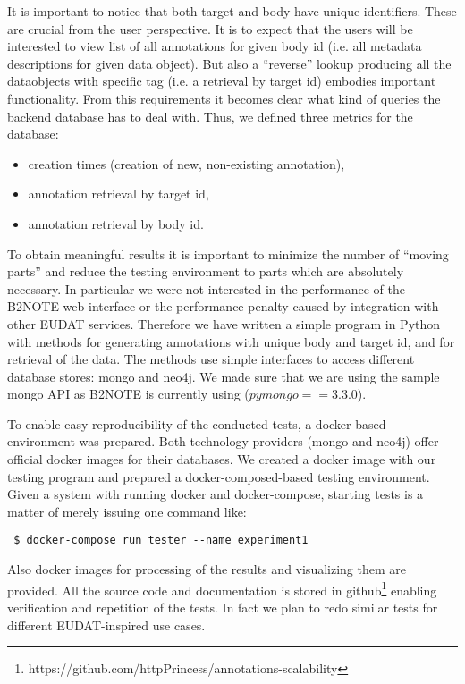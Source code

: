 \documentclass[a4paper,10pt]{article}
\begin{document}
It is important to notice that both target and body have unique identifiers. 
These are crucial from the user perspective. It is to expect that the users will 
be interested to view list of all annotations for given body id (i.e. all 
metadata descriptions for given data object). But also a ``reverse'' lookup 
producing all the dataobjects with specific tag (i.e. a retrieval by target id) 
embodies important functionality. From this requirements it becomes clear what 
kind of queries the backend database has to deal with. Thus, we defined three 
metrics for the database:
\begin{itemize}
 \item creation times (creation of new, non-existing annotation),
 \item annotation retrieval by target id,
 \item annotation retrieval by body id.
\end{itemize}

To obtain meaningful results it is important to minimize the number of ``moving 
parts'' and reduce the testing environment to parts which are absolutely 
necessary. In particular we were not interested in the performance of the B2NOTE 
web interface or the performance penalty caused by integration with other EUDAT 
services. Therefore we have written a simple program in Python with methods 
for generating annotations with unique body and target id, and for retrieval
of the data. The methods use simple interfaces to access different database
stores: mongo and neo4j. We made sure that we are using the sample mongo API 
as B2NOTE is currently using ($pymongo==3.3.0$). 

To enable easy reproducibility of the conducted tests, a docker-based environment
was prepared. Both technology providers (mongo and neo4j) offer official docker
images for their databases. We created a docker image with our testing program
and prepared a docker-composed-based testing environment. Given a system
with running docker and docker-compose, starting tests is a matter of merely 
issuing one command like: 
\begin{verbatim}
 $ docker-compose run tester --name experiment1 
\end{verbatim}

Also docker images for processing of the results and visualizing them are 
provided. All the source code and documentation is stored in 
github\footnote{https://github.com/httpPrincess/annotations-scalability} 
enabling verification and repetition of the tests. In fact we plan to 
redo similar tests for different EUDAT-inspired use cases. 
\end{document}
